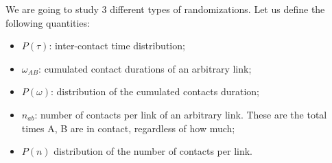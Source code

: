 \documentclass[../main/main.tex]{subfiles}
\begin{document}
We are going to study 3 different types of randomizations.
Let us define the following quantities:
\begin{itemize}
    \item $P(\tau)$: inter-contact time distribution;
    \item $\omega_{AB}$: cumulated contact durations of an arbitrary link;
    \item $P(\omega)$: distribution of the cumulated contacts duration;
    \item $n_{ab}$: number of contacts per link of an arbitrary link. These are the total times A, B are in contact, regardless of how much;
    \item $P(n)$ distribution of the number of contacts per link.
\end{itemize}


\begin{figure}[h!]
\begin{minipage}[c]{0.5\linewidth}
\end{minipage}
\begin{minipage}[]{0.5\linewidth}
\centering
{}
\end{minipage}\\
\begin{minipage}[c]{0.5\linewidth}

\end{minipage}
\end{figure}
\end{document}
